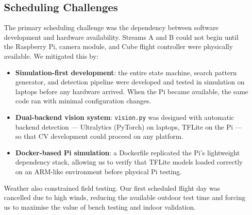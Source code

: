 \subsection{Scheduling Challenges}

The primary scheduling challenge was the dependency between software development and hardware availability. Streams A and B could not begin until the Raspberry Pi, camera module, and Cube flight controller were physically available. We mitigated this by:

\begin{itemize}
  \item \textbf{Simulation-first development}: the entire state machine, search pattern generator, and detection pipeline were developed and tested in simulation on laptops before any hardware arrived. When the Pi became available, the same code ran with minimal configuration changes.
  \item \textbf{Dual-backend vision system}: \texttt{vision.py} was designed with automatic backend detection --- Ultralytics (PyTorch) on laptops, TFLite on the Pi --- so that CV development could proceed on any platform.
  \item \textbf{Docker-based Pi simulation}: a Dockerfile replicated the Pi's lightweight dependency stack, allowing us to verify that TFLite models loaded correctly on an ARM-like environment before physical Pi testing.
\end{itemize}

Weather also constrained field testing. Our first scheduled flight day was cancelled due to high winds, reducing the available outdoor test time and forcing us to maximise the value of bench testing and indoor validation.
